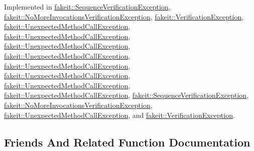 Implemented in \mbox{\hyperlink{structfakeit_1_1SequenceVerificationException_a0346dd2569b455290bde744e57e87e89}{fakeit\+::\+Sequence\+Verification\+Exception}}, \mbox{\hyperlink{structfakeit_1_1NoMoreInvocationsVerificationException_afbb7a2342bae73503d9fdc0a9f39c343}{fakeit\+::\+No\+More\+Invocations\+Verification\+Exception}}, \mbox{\hyperlink{structfakeit_1_1VerificationException_aba8bb8f60a0427c01868a0ab0388fd0b}{fakeit\+::\+Verification\+Exception}}, \mbox{\hyperlink{structfakeit_1_1UnexpectedMethodCallException_aabd833b1856e1cf842d2eafc3abf0a0e}{fakeit\+::\+Unexpected\+Method\+Call\+Exception}}, \mbox{\hyperlink{structfakeit_1_1UnexpectedMethodCallException_aabd833b1856e1cf842d2eafc3abf0a0e}{fakeit\+::\+Unexpected\+Method\+Call\+Exception}}, \mbox{\hyperlink{structfakeit_1_1UnexpectedMethodCallException_aabd833b1856e1cf842d2eafc3abf0a0e}{fakeit\+::\+Unexpected\+Method\+Call\+Exception}}, \mbox{\hyperlink{structfakeit_1_1UnexpectedMethodCallException_aabd833b1856e1cf842d2eafc3abf0a0e}{fakeit\+::\+Unexpected\+Method\+Call\+Exception}}, \mbox{\hyperlink{structfakeit_1_1UnexpectedMethodCallException_aabd833b1856e1cf842d2eafc3abf0a0e}{fakeit\+::\+Unexpected\+Method\+Call\+Exception}}, \mbox{\hyperlink{structfakeit_1_1UnexpectedMethodCallException_aabd833b1856e1cf842d2eafc3abf0a0e}{fakeit\+::\+Unexpected\+Method\+Call\+Exception}}, \mbox{\hyperlink{structfakeit_1_1UnexpectedMethodCallException_aabd833b1856e1cf842d2eafc3abf0a0e}{fakeit\+::\+Unexpected\+Method\+Call\+Exception}}, \mbox{\hyperlink{structfakeit_1_1UnexpectedMethodCallException_aabd833b1856e1cf842d2eafc3abf0a0e}{fakeit\+::\+Unexpected\+Method\+Call\+Exception}}, \mbox{\hyperlink{structfakeit_1_1SequenceVerificationException_a0346dd2569b455290bde744e57e87e89}{fakeit\+::\+Sequence\+Verification\+Exception}}, \mbox{\hyperlink{structfakeit_1_1NoMoreInvocationsVerificationException_afbb7a2342bae73503d9fdc0a9f39c343}{fakeit\+::\+No\+More\+Invocations\+Verification\+Exception}}, \mbox{\hyperlink{structfakeit_1_1UnexpectedMethodCallException_aabd833b1856e1cf842d2eafc3abf0a0e}{fakeit\+::\+Unexpected\+Method\+Call\+Exception}}, and \mbox{\hyperlink{structfakeit_1_1VerificationException_aba8bb8f60a0427c01868a0ab0388fd0b}{fakeit\+::\+Verification\+Exception}}.



\subsection{Friends And Related Function Documentation}
\mbox{\label{structfakeit_1_1FakeitException_a8321660a372d94f410baf5fee0302fd7}} 
